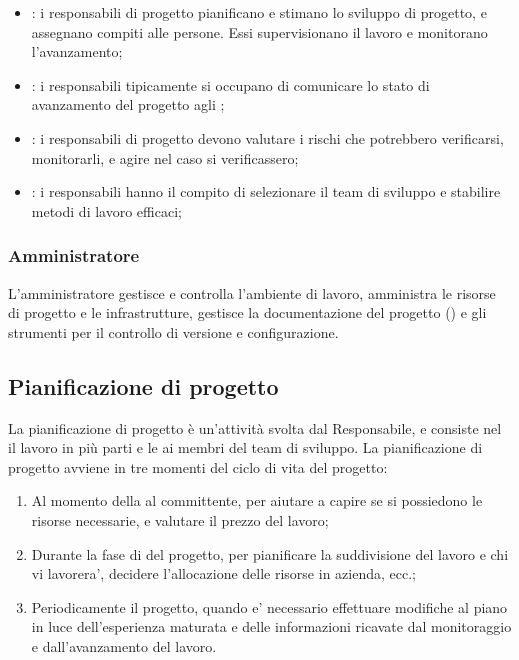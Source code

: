 \begin{itemize}
  \item {}: i responsabili di progetto
    pianificano e stimano lo sviluppo di progetto, e assegnano compiti alle
    persone. Essi supervisionano il lavoro e monitorano l'avanzamento;
  \item {}: i responsabili tipicamente si occupano di
    comunicare lo stato di avanzamento del progetto agli ;
  \item {}: i responsabili di progetto devono valutare
    i rischi che potrebbero verificarsi, monitorarli, e agire nel caso si
    verificassero;
  \item {}: i responsabili hanno il compito di
    selezionare il team di sviluppo e stabilire metodi di lavoro efficaci;
\end{itemize}

\subsubsection{Amministratore}

L'amministratore gestisce e controlla l'ambiente di lavoro, amministra le
risorse di progetto e le infrastrutture, gestisce la documentazione del progetto
() e gli strumenti per il controllo di versione e
configurazione.

\subsection{Pianificazione di progetto}

La pianificazione di progetto è un'attività svolta dal Responsabile, e consiste
nel  il lavoro in più parti e le  ai
membri del team di sviluppo. La pianificazione di progetto avviene in tre
momenti del ciclo di vita del progetto:

\begin{enumerate}
  \item Al momento della  al committente, per aiutare a capire
    se si possiedono le risorse necessarie, e valutare il prezzo del lavoro;
  \item Durante la fase di  del progetto, per pianificare la
    suddivisione del lavoro e chi vi lavorera', decidere l'allocazione delle
    risorse in azienda, ecc.;
  \item Periodicamente  il progetto, quando e' necessario
    effettuare modifiche al piano in luce dell'esperienza maturata e delle
    informazioni ricavate dal monitoraggio e dall'avanzamento del lavoro.
\end{enumerate}

